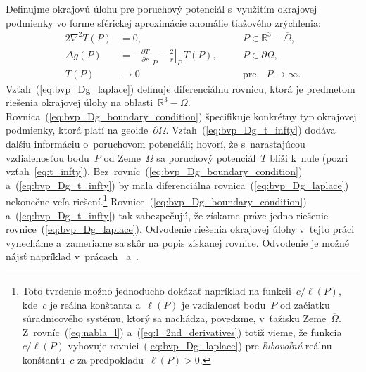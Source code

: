 \documentclass[a4paper, 12pt]{book}
\begin{document}
Definujme okrajovú úlohu pre poruchový potenciál s~využitím okrajovej podmienky 
vo forme sférickej aproximácie anomálie tiažového zrýchlenia:
%
\begin{alignat}{2}
\nabla^2 T(P) &= 0{,} &&P \in \mathbb{R}^3 
- \overline\Omega{,}\label{eq:bvp_Dg_laplace}\\
\Delta g(P) &= -\left.\frac{\partial T}{\partial r}\right|_P 
- \left.\frac{2}{r}\right|_P \, T(P){,} \quad &&P \in 
\partial\Omega{,}\label{eq:bvp_Dg_boundary_condition}\\
T(P) &\rightarrow 0 &&\textrm{pre} \quad P \rightarrow 
\infty{.}\label{eq:bvp_Dg_t_infty}
\end{alignat}
%
Vzťah~(\ref{eq:bvp_Dg_laplace}) definuje diferenciálnu rovnicu, ktorá je 
predmetom riešenia okrajovej úlohy na oblasti~$\mathbb{R}^3 - \overline\Omega$.  
Rovnica~(\ref{eq:bvp_Dg_boundary_condition}) špecifikuje konkrétny typ 
okrajovej podmienky, ktorá platí na geoide~$\partial\Omega$.  
Vzťah~(\ref{eq:bvp_Dg_t_infty}) dodáva ďalšiu informáciu o~poruchovom 
potenciáli; hovorí, že s~narastajúcou vzdialenosťou bodu~$P$ od 
Zeme~$\overline\Omega$ sa poruchový potenciál~$T$ blíži k~nule (pozri 
vzťah~\ref{eq:t_infty}).  Bez~rovníc~(\ref{eq:bvp_Dg_boundary_condition}) 
a~(\ref{eq:bvp_Dg_t_infty}) by mala diferenciálna 
rovnica~(\ref{eq:bvp_Dg_laplace}) nekonečne veľa riešení.\footnote{Toto 
tvrdenie možno jednoducho dokázať napríklad na funkcii~$c \slash \ell(P)$, 
kde~$c$ je reálna konštanta a~$\ell(P)$ je vzdialenosť bodu~$P$ od začiatku 
súradnicového systému, ktorý sa nachádza, povedzme, v~ťažisku 
Zeme~$\overline\Omega$.  Z~rovníc~(\ref{eq:nabla_l}) 
a~(\ref{eq:l_2nd_derivatives}) totiž vieme, že funkcia~$c \slash \ell(P)$ 
vyhovuje rovnici~(\ref{eq:bvp_Dg_laplace}) pre \emph{ľubovoľnú} reálnu 
konštantu~$c$ za predpokladu~$\ell(P) > 0$.}  
Rovnice~(\ref{eq:bvp_Dg_boundary_condition}) a~(\ref{eq:bvp_Dg_t_infty}) tak 
zabezpečujú, že získame práve jedno riešenie rovnice~(\ref{eq:bvp_Dg_laplace}).  
Odvodenie riešenia okrajovej úlohy v~tejto práci vynecháme a~zameriame sa skôr 
na popis získanej rovnice.  Odvodenie je možné nájsť napríklad 
v~prácach~\textcite{MoritzPhysicalGeodesy} a~\textcite{Janak2006}.
\end{document}
